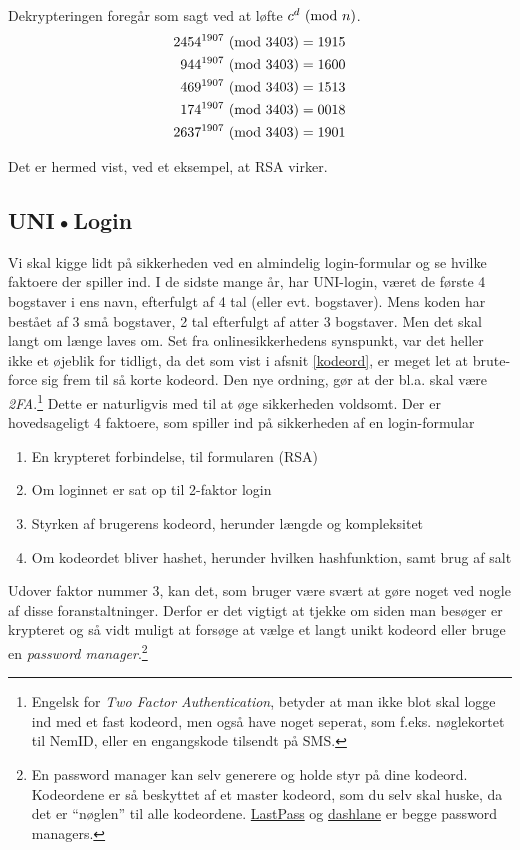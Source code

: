 Dekrypteringen foregår som sagt ved at løfte \(c^d \ (\mathrm{mod}\ n)\).
\begin{align*}
    2454^{1907} \ (\mathrm{mod}\ 3403) &= 1915\\
    944^{1907} \ (\mathrm{mod}\ 3403)  &= 1600\\
    469^{1907} \ (\mathrm{mod}\ 3403)  &= 1513\\
    174^{1907} \ (\mathrm{mod}\ 3403)  &= 0018\\
    2637^{1907} \ (\mathrm{mod}\ 3403) &= 1901\\
\end{align*}

Det er hermed vist, ved et eksempel, at RSA virker.



\subsection{UNI•Login}
Vi skal kigge lidt på sikkerheden ved en almindelig login-formular og se hvilke faktoere der spiller ind.
I de sidste mange år, har UNI-login, været de første 4 bogstaver i ens navn, efterfulgt af 4 tal (eller evt. bogstaver).
Mens koden har bestået af 3 små bogstaver, 2 tal efterfulgt af atter 3 bogstaver.
Men det skal langt om længe laves om. \cite{unilogin}
Set fra onlinesikkerhedens synspunkt, var det heller ikke et øjeblik for tidligt, da det som vist i afsnit \ref{kodeord}, er meget let at brute-force sig frem til så korte kodeord.
Den nye ordning, gør at der bl.a. skal være \emph{2FA}.\footnote{Engelsk for \emph{Two Factor Authentication}, betyder at man ikke blot skal logge ind med et fast kodeord, men også have noget seperat, som f.eks. nøglekortet til NemID, eller en engangskode tilsendt på SMS.}
Dette er naturligvis med til at øge sikkerheden voldsomt.
Der er hovedsageligt 4 faktoere, som spiller ind på sikkerheden af en login-formular
\begin{enumerate}[noitemsep]
    \item En krypteret forbindelse, til formularen (RSA)
    \item Om loginnet er sat op til 2-faktor login
    \item Styrken af brugerens kodeord, herunder længde og kompleksitet
    \item Om kodeordet bliver hashet, herunder hvilken hashfunktion, samt brug af salt
\end{enumerate}


Udover faktor nummer 3, kan det, som bruger være svært at gøre noget ved nogle af disse foranstaltninger.
Derfor er det vigtigt at tjekke om siden man besøger er krypteret og så vidt muligt at forsøge at vælge et langt unikt kodeord eller bruge en \emph{password manager}.\footnote{En password manager kan selv generere og holde styr på dine kodeord. Kodeordene er så beskyttet af et master kodeord, som du selv skal huske, da det er ``nøglen'' til alle kodeordene. \href{https://www.lastpass.com/}{LastPass} og \href{https://www.dashlane.com/}{dashlane} er begge password managers.}

